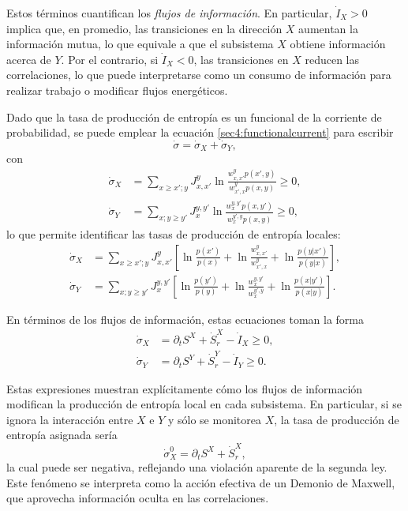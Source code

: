 Estos términos cuantifican los \textit{flujos de información}. En particular, \( \dot{I}_{X} > 0 \) implica que, en promedio, las transiciones en la dirección \( X \) aumentan la información mutua, lo que equivale a que el subsistema \( X \) obtiene información acerca de \( Y \). Por el contrario, si \( \dot{I}_{X} < 0 \), las transiciones en \( X \) reducen las correlaciones, lo que puede interpretarse como un consumo de información para realizar trabajo o modificar flujos energéticos.

Dado que la tasa de producción de entropía es un funcional de la corriente de probabilidad, se puede emplear la ecuación \eqref{sec4:functionalcurrent} para escribir
\[
\dot{\sigma} = \dot{\sigma}_{X} + \dot{\sigma}_{Y},
\]
con
\begin{align*}
    \dot{\sigma}_{X} & = \sum_{x \geq x';y} J_{x,x'}^{y} \ln  \frac{w_{x,x'}^{y} p(x',y) }{w_{x',x}^{y} p(x,y) } \geq 0, \\
    \dot{\sigma}_{Y} & = \sum_{x;y\geq y'}J_{x}^{y,y'} \ln \frac{w_{x}^{y,y'} p(x,y') }{ w_{x}^{y',y} p(x,y) } \geq 0,
\end{align*}
lo que permite identificar las tasas de producción de entropía locales:
\begin{align*}
    \dot{\sigma}_{X} &  = \sum_{x \geq x';y} J_{x,x'}^{y} \left[ \ln \frac{p(x')}{p(x)}  +\ln \frac{w_{x,x'}^{y}}{ w_{x',x}^{y} } + \ln \frac{p(y|x')}{p(y|x)} \right], \\
    \dot{\sigma}_{Y} &  = \sum_{x;y \geq y'} J_{x}^{y,y'} \left[ \ln \frac{p(y')}{p(y)}  + \ln \frac{w_{x}^{y,y'}}{ w_{x}^{y',y} } + \ln \frac{p(x|y')}{p(x|y)} \right].
\end{align*}

En términos de los flujos de información, estas ecuaciones toman la forma
\begin{align*}
    \dot{\sigma}_{X} & = \partial_{t}S^{X} + \dot{S}_{r}^{X} - \dot{I}_{X} \geq 0, \\
    \dot{\sigma}_{Y} & = \partial_{t}S^{Y} + \dot{S}_{r}^{Y} - \dot{I}_{Y} \geq 0.
\end{align*}

Estas expresiones muestran explícitamente cómo los flujos de información modifican la producción de entropía local en cada subsistema. En particular, si se ignora la interacción entre \( X \) e \( Y \) y sólo se monitorea \( X \), la tasa de producción de entropía asignada sería
\[
\dot{\sigma}_{X}^0 = \partial_{t} S^{X} + \dot{S}_{r}^{X},
\]
la cual puede ser negativa, reflejando una violación aparente de la segunda ley. Este fenómeno se interpreta como la acción efectiva de un Demonio de Maxwell, que aprovecha información oculta en las correlaciones.


